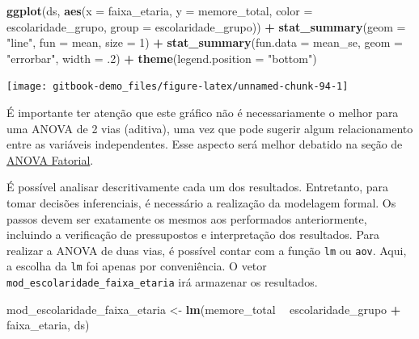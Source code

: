 \documentclass[
]{book}
\newenvironment{Shaded}{\begin{snugshade}}{\end{snugshade}}
\newcommand{\DataTypeTok}[1]{\textcolor[rgb]{0.13,0.29,0.53}{#1}}
\newcommand{\DecValTok}[1]{\textcolor[rgb]{0.00,0.00,0.81}{#1}}
\newcommand{\FloatTok}[1]{\textcolor[rgb]{0.00,0.00,0.81}{#1}}
\newcommand{\KeywordTok}[1]{\textcolor[rgb]{0.13,0.29,0.53}{\textbf{#1}}}
\newcommand{\NormalTok}[1]{#1}
\newcommand{\OperatorTok}[1]{\textcolor[rgb]{0.81,0.36,0.00}{\textbf{#1}}}
\newcommand{\StringTok}[1]{\textcolor[rgb]{0.31,0.60,0.02}{#1}}
\begin{document}
\begin{Shaded}
\begin{Highlighting}[]
\KeywordTok{ggplot}\NormalTok{(ds, }\KeywordTok{aes}\NormalTok{(}\DataTypeTok{x =}\NormalTok{ faixa_etaria, }\DataTypeTok{y =}\NormalTok{ memore_total, }
               \DataTypeTok{color =}\NormalTok{ escolaridade_grupo, }
               \DataTypeTok{group  =}\NormalTok{ escolaridade_grupo)) }\OperatorTok{+}
\StringTok{  }\KeywordTok{stat_summary}\NormalTok{(}\DataTypeTok{geom =} \StringTok{"line"}\NormalTok{, }\DataTypeTok{fun =}\NormalTok{ mean, }\DataTypeTok{size =} \DecValTok{1}\NormalTok{) }\OperatorTok{+}
\StringTok{  }\KeywordTok{stat_summary}\NormalTok{(}\DataTypeTok{fun.data =}\NormalTok{ mean_se, }
               \DataTypeTok{geom =} \StringTok{"errorbar"}\NormalTok{, }\DataTypeTok{width =} \FloatTok{.2}\NormalTok{) }\OperatorTok{+}
\StringTok{  }\KeywordTok{theme}\NormalTok{(}\DataTypeTok{legend.position =} \StringTok{"bottom"}\NormalTok{)}
\end{Highlighting}
\end{Shaded}

\begin{center}\texttt{[image: gitbook-demo\_files/figure-latex/unnamed-chunk-94-1]} \end{center}

É importante ter atenção que este gráfico não é necessariamente o melhor para uma ANOVA de 2 vias (aditiva), uma vez que pode sugerir algum relacionamento entre as variáveis independentes. Esse aspecto será melhor debatido na seção de \protect\hyperlink{anova_fatorial}{ANOVA Fatorial}.

É possível analisar descritivamente cada um dos resultados. Entretanto, para tomar decisões inferenciais, é necessário a realização da modelagem formal. Os passos devem ser exatamente os mesmos aos performados anteriormente, incluindo a verificação de pressupostos e interpretação dos resultados. Para realizar a ANOVA de duas vias, é possível contar com a função \texttt{lm} ou \texttt{aov}. Aqui, a escolha da \texttt{lm} foi apenas por conveniência. O vetor \texttt{mod\_escolaridade\_faixa\_etaria} irá armazenar os resultados.

\begin{Shaded}
\begin{Highlighting}[]
\NormalTok{mod_escolaridade_faixa_etaria <-}\StringTok{ }\KeywordTok{lm}\NormalTok{(memore_total }\OperatorTok{~}\StringTok{ }\NormalTok{escolaridade_grupo }\OperatorTok{+}\StringTok{ }\NormalTok{faixa_etaria, ds)}
\end{Highlighting}
\end{Shaded}
\end{document}
